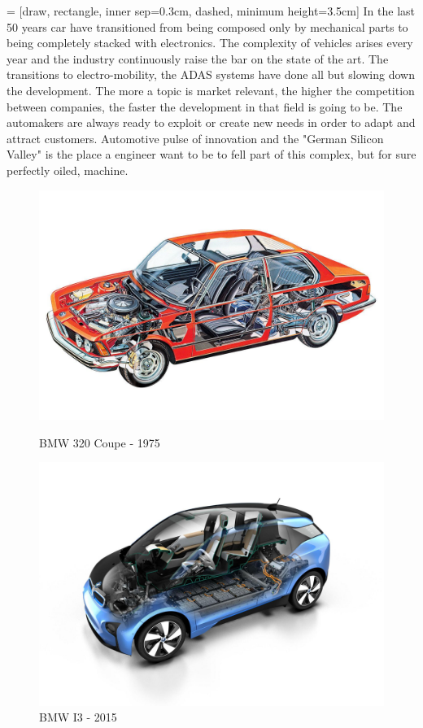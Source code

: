 \documentclass[../main.tex]{subfiles}
\begin{document}
 = [draw, rectangle, inner sep=0.3cm, dashed, minimum height=3.5cm]
In the last 50 years car have transitioned from being composed only by mechanical parts to being completely stacked with electronics. The complexity of vehicles arises every year and the industry continuously raise the bar on the state of the art. The transitions to electro-mobility, the ADAS systems have done all but slowing down the development. The more a topic is market relevant, the higher the competition between companies, the faster the development in that field is going to be. The automakers are always ready to exploit or create new needs in order to adapt and attract customers. Automotive pulse of innovation and the "German Silicon Valley" is the place a engineer want to be to fell part of this complex, but for sure perfectly oiled, machine.   
\begin{figure}
\centering
\begin{minipage}{.5\textwidth}
  \centering
  \includegraphics[width=\linewidth]{images_folder/4a56e1d50b56da42a10e29d451cf2b93.jpg}
  \caption{BMW 320 Coupe - 1975}
  \label{fig:test1}
\end{minipage}%
\begin{minipage}{.5\textwidth}
  \centering
  \includegraphics[width=\linewidth]{images_folder/BMW_i3.jpg}
  \caption{BMW I3 - 2015}
  \label{fig:test2}
\end{minipage}
\end{figure}
\end{document}
